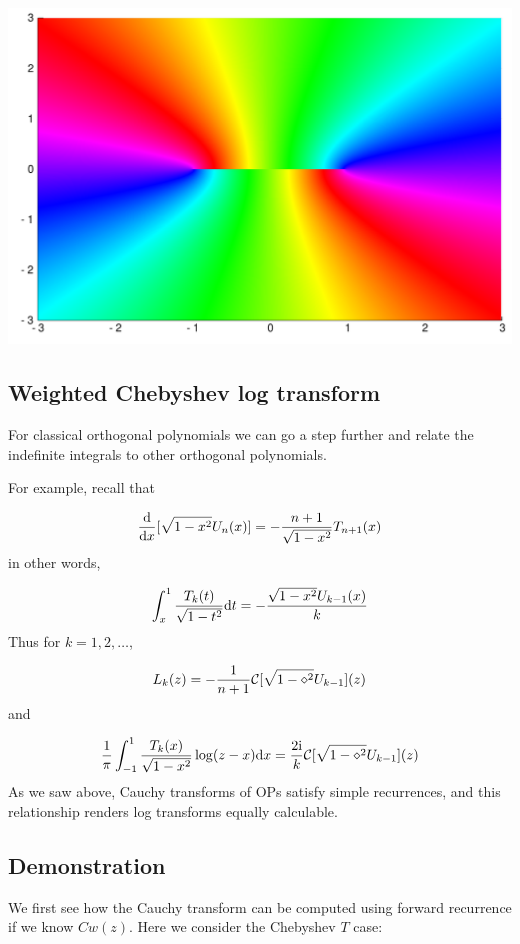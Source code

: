 \documentclass[12pt,a4paper]{article}
\def\D{ {\rm d} }
\def\I{ {\rm i} }
\def\CC{ {\cal C} }
\def\dx{\D x}
\def\dt{\D t}
\begin{document}
\includegraphics[width=\linewidth]{figures/Lecture23_1_1.pdf}

\subsection{Weighted Chebyshev log transform}
For classical orthogonal polynomials we can go a step further and relate the indefinite integrals to other orthogonal polynomials.

For example, recall that

\[
{\D\over \dx}[\sqrt{1-x^2} U_n(x)] = -{n+1 \over \sqrt{1-x^2}} T_{n+1}(x)
\]
in other words, 

\[
\int_x^1 {T_k(t) \over \sqrt{1-t^2}} \dt = -{\sqrt{1-x^2} U_{k-1}(x) \over k}
\]
Thus for $k=1,2,\ldots$,

\[
L_k(z) = -{1 \over n+1} \CC[\sqrt{1-\diamond^2} U_{k-1}](z)
\]
and

\[
{1 \over \pi} \int_{-1}^1 {T_k(x) \over \sqrt{1-x^2}}\log(z-x) \dx = {2 \I \over k}   \CC[\sqrt{1-\diamond^2} U_{k-1}](z)
\]
As we saw above, Cauchy transforms of OPs satisfy simple recurrences, and this relationship renders log transforms equally calculable. 

\subsection{Demonstration}
We first see how the Cauchy transform can be computed using forward recurrence if we know $C w(z)$. Here we consider the Chebyshev $T$ case:
\end{document}
